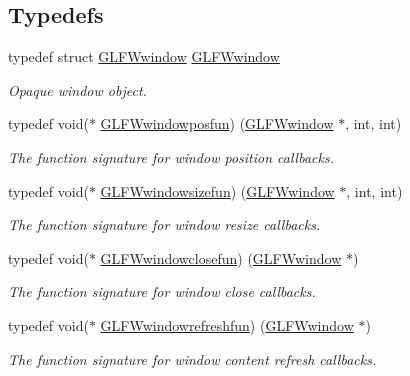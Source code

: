 \subsection*{Typedefs}
\begin{DoxyCompactItemize}
\item 
typedef struct \hyperlink{group__window_ga3c96d80d363e67d13a41b5d1821f3242}{G\+L\+F\+Wwindow} \hyperlink{group__window_ga3c96d80d363e67d13a41b5d1821f3242}{G\+L\+F\+Wwindow}
\begin{DoxyCompactList}\small\item\em Opaque window object. \end{DoxyCompactList}\item 
typedef void($\ast$ \hyperlink{group__window_gafd8db81fdb0e850549dc6bace5ed697a}{G\+L\+F\+Wwindowposfun}) (\hyperlink{group__window_ga3c96d80d363e67d13a41b5d1821f3242}{G\+L\+F\+Wwindow} $\ast$, int, int)
\begin{DoxyCompactList}\small\item\em The function signature for window position callbacks. \end{DoxyCompactList}\item 
typedef void($\ast$ \hyperlink{group__window_gae49ee6ebc03fa2da024b89943a331355}{G\+L\+F\+Wwindowsizefun}) (\hyperlink{group__window_ga3c96d80d363e67d13a41b5d1821f3242}{G\+L\+F\+Wwindow} $\ast$, int, int)
\begin{DoxyCompactList}\small\item\em The function signature for window resize callbacks. \end{DoxyCompactList}\item 
typedef void($\ast$ \hyperlink{group__window_ga93e7c2555bd837f4ed8b20f76cada72e}{G\+L\+F\+Wwindowclosefun}) (\hyperlink{group__window_ga3c96d80d363e67d13a41b5d1821f3242}{G\+L\+F\+Wwindow} $\ast$)
\begin{DoxyCompactList}\small\item\em The function signature for window close callbacks. \end{DoxyCompactList}\item 
typedef void($\ast$ \hyperlink{group__window_ga7a56f9e0227e2cd9470d80d919032e08}{G\+L\+F\+Wwindowrefreshfun}) (\hyperlink{group__window_ga3c96d80d363e67d13a41b5d1821f3242}{G\+L\+F\+Wwindow} $\ast$)
\begin{DoxyCompactList}\small\item\em The function signature for window content refresh callbacks. \end{DoxyCompactList}\item 

\end{DoxyCompactItemize}
